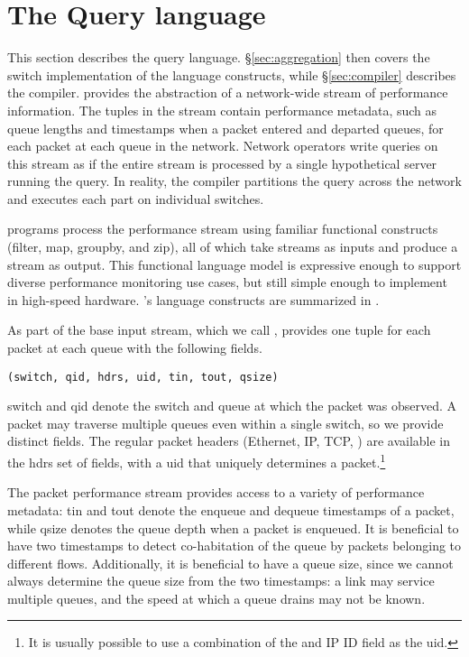 \section{The \TheSystem Query language}
\label{sec:language}
This section describes the \TheSystem query language.
\S\ref{sec:aggregation} then covers the switch implementation of the
language constructs, while \S\ref{sec:compiler} describes the compiler.
\TheSystem provides the abstraction of a network-wide stream of performance
information. The tuples in the stream contain performance metadata, such as
queue lengths and timestamps when a packet entered and departed queues, for
each packet at each queue in the network. Network operators write queries
on this stream as if the entire stream is processed by a single hypothetical
server running the query. In reality, the compiler partitions the query across the
network and executes each part on individual switches.

\TheSystem programs process the performance stream using familiar functional
constructs ({\ct filter}, {\ct map}, {\ct groupby}, and {\ct zip}), all of
which take streams as inputs and produce a stream as output. This functional
language model is expressive enough to support diverse performance monitoring
use cases, but still simple enough to implement in high-speed hardware.
\TheSystem's language constructs are summarized in
.



 As part of the base input stream, which we
call {\ct \pktlog}, \TheSystem provides one tuple for each packet at each queue
with the following fields.
\begin{lstlisting}
(switch, qid, hdrs, uid, tin, tout, qsize)
\end{lstlisting}
{\ct switch} and {\ct qid} denote the switch and queue at which the
packet was observed. A packet may traverse multiple queues even within a single
switch, so we provide distinct fields. The regular packet headers (Ethernet,
IP, TCP, \etc) are available in the {\ct hdrs} set of fields, with a {\ct uid}
that uniquely determines a packet.\footnote{It is usually possible to
use a combination of the \txtftuple and IP ID field as the {\ctfoot uid}.}

The packet performance stream provides access to a variety of performance
metadata: {\ct tin} and {\ct tout} denote the enqueue and dequeue timestamps of
a packet, while {\ct qsize} denotes the queue depth when
a packet is enqueued. It is beneficial to have two timestamps to detect
co-habitation of the queue by packets belonging to different flows.
Additionally, it is beneficial to have a queue size, since we cannot always
determine the queue size from the two timestamps: a link may service multiple
queues, and the speed at which a queue drains may not be known. 

